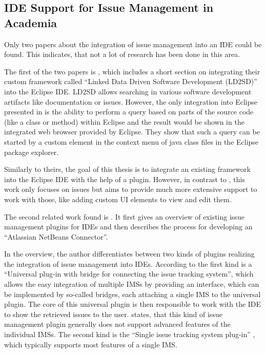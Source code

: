 \subsection{\gls{IDE} Support for Issue Management in Academia} 
\label{ssec:ch2:ss2.2}
Only two papers about the integration of issue management into an \gls{IDE} could be found.
This indicates, that not a lot of research has been done in this area.

The first of the two papers is \cite{iqbal2009integrating},
which includes a short section on integrating their custom framework called ``Linked Data Driven Software Development (LD2SD)'' 
into the \gls{Eclipse} \gls{IDE}.
LD2SD allows searching in various software development artifacts like documentation or issues.
However, the only integration into \gls{Eclipse} presented in \cite{iqbal2009integrating} is the ability to perform a query based on 
parts of the source code (like a class or method) within \gls{Eclipse} and the result would be shown in the integrated web browser provided by \gls{Eclipse}.
They show that such a query can be started by a custom element in the context menu of \gls{java} class files in the \gls{Eclipse} package explorer.

Similarly to theirs, the goal of this thesis is to integrate an existing framework into the \gls{Eclipse} \gls{IDE} with the help of a plugin.
However, in contrast to \cite{iqbal2009integrating}, this work only focuses on issues but aims to provide much more extensive support to work with those, like adding custom \gls{UI} elements to view and edit them.

The second related work found is \cite{janak2009issue}.
It first gives an overview of existing issue management plugins for \glspl{IDE} and then describes the process for developing an ``Atlassian NetBeans Connector''.

In the overview, the author differentiates between two kinds of plugins realizing the integration of issue management into \glspl{IDE}.
According to \cite{janak2009issue} the first kind is a ``Universal plug-in with bridge for connecting the issue tracking system'',
which allows the easy integration of multiple \glspl{IMS} by providing an interface, which can be implemented by so-called bridges, 
each attaching a single \gls{IMS} to the universal plugin.
The core of this universal plugin is then responsible to work with the \gls{IDE} to show the retrieved issues to the user.
\Cite{janak2009issue} states, that this kind of issue management plugin generally does not support advanced features of the individual \glspl{IMS}.
The second kind is the ``Single issue tracking system plug-in'' \cite{janak2009issue}, which typically supports most features of a single \gls{IMS}.

